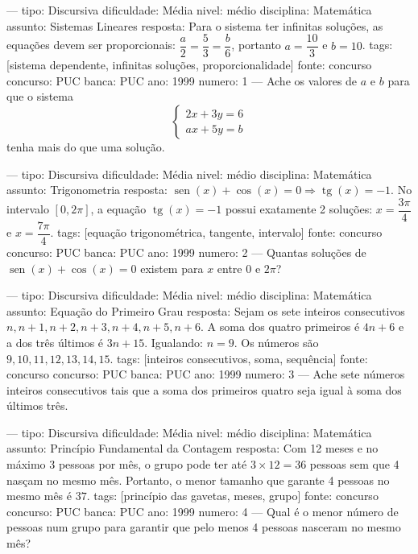 
---
tipo: Discursiva
dificuldade: Média
nivel: médio
disciplina: Matemática
assunto: Sistemas Lineares
resposta: Para o sistema ter infinitas soluções, as equações devem ser proporcionais: $\dfrac{a}{2} = \dfrac{5}{3} = \dfrac{b}{6}$, portanto $a = \dfrac{10}{3}$ e $b = 10$.
tags: [sistema dependente, infinitas soluções, proporcionalidade]
fonte: concurso
concurso: PUC
banca: PUC
ano: 1999
numero: 1
---
\question
Ache os valores de $a$ e $b$ para que o sistema
$$\begin{cases} 2x + 3y = 6 \\ ax + 5y = b \end{cases}$$
tenha mais do que uma solução.

---
tipo: Discursiva
dificuldade: Média
nivel: médio
disciplina: Matemática
assunto: Trigonometria
resposta: $\operatorname{sen}(x) + \cos(x) = 0 \Rightarrow \operatorname{tg}(x) = -1$. No intervalo $[0, 2\pi]$, a equação $\operatorname{tg}(x) = -1$ possui exatamente 2 soluções: $x = \dfrac{3\pi}{4}$ e $x = \dfrac{7\pi}{4}$.
tags: [equação trigonométrica, tangente, intervalo]
fonte: concurso
concurso: PUC
banca: PUC
ano: 1999
numero: 2
---
\question
Quantas soluções de $\operatorname{sen}(x) + \cos(x) = 0$ existem para $x$ entre $0$ e $2\pi$?

---
tipo: Discursiva
dificuldade: Média
nivel: médio
disciplina: Matemática
assunto: Equação do Primeiro Grau
resposta: Sejam os sete inteiros consecutivos $n, n+1, n+2, n+3, n+4, n+5, n+6$. A soma dos quatro primeiros é $4n+6$ e a dos três últimos é $3n+15$. Igualando: $n = 9$. Os números são $9, 10, 11, 12, 13, 14, 15$.
tags: [inteiros consecutivos, soma, sequência]
fonte: concurso
concurso: PUC
banca: PUC
ano: 1999
numero: 3
---
\question
Ache sete números inteiros consecutivos tais que a soma dos primeiros quatro seja igual à soma dos últimos três.

---
tipo: Discursiva
dificuldade: Média
nivel: médio
disciplina: Matemática
assunto: Princípio Fundamental da Contagem
resposta: Com 12 meses e no máximo 3 pessoas por mês, o grupo pode ter até $3 \times 12 = 36$ pessoas sem que 4 nasçam no mesmo mês. Portanto, o menor tamanho que garante 4 pessoas no mesmo mês é $37$.
tags: [princípio das gavetas, meses, grupo]
fonte: concurso
concurso: PUC
banca: PUC
ano: 1999
numero: 4
---
\question
Qual é o menor número de pessoas num grupo para garantir que pelo menos 4 pessoas nasceram no mesmo mês?

